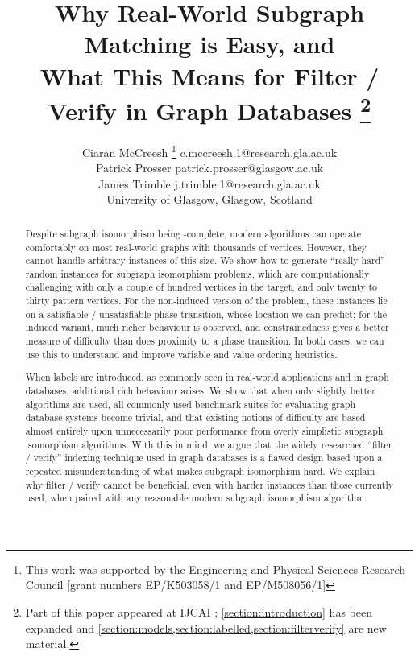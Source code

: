 \documentclass[twoside,11pt]{article}
\newcommand{\citep}[1]{\cite{#1}}
\newcommand*\samethanks[1][\value{footnote}]{\footnotemark[#1]}
\begin{document}
\title{Why Real-World Subgraph Matching is Easy, and \\ What This Means for Filter / Verify in
Graph Databases \thanks{Part of this paper appeared at IJCAI
\citep{DBLP:conf/ijcai/McCreeshPT16}; \cref{section:introduction} has been expanded and
\cref{section:models,section:labelled,section:filterverify} are new material.}}

\author{\name Ciaran McCreesh \thanks{This work was supported by the Engineering and Physical Sciences
           Research Council [grant numbers EP/K503058/1 and EP/M508056/1]} \email c.mccreesh.1@research.gla.ac.uk \\
       \name Patrick Prosser \email patrick.prosser@glasgow.ac.uk \\
       \name James Trimble \samethanks \email j.trimble.1@research.gla.ac.uk \\
   \addr University of Glasgow, Glasgow, Scotland}
\maketitle

\begin{abstract}
    Despite subgraph isomorphism being \NP-complete, modern algorithms can operate comfortably on
    most real-world graphs with thousands of vertices. However, they cannot handle arbitrary instances of
    this size. We show how to generate ``really hard'' random instances for subgraph isomorphism
    problems, which are computationally challenging with only a couple of hundred vertices in the
    target, and only twenty to thirty pattern vertices. For the non-induced version of the problem,
    these instances lie on a satisfiable / unsatisfiable phase transition, whose location we can
    predict; for the induced variant, much richer behaviour is observed, and constrainedness gives a
    better measure of difficulty than does proximity to a phase transition. In both cases, we can
    use this to understand and improve variable and value ordering heuristics.

    When labels are introduced, as commonly seen in real-world applications and in graph databases,
    additional rich behaviour arises.  We show that when only slightly better algorithms are used,
    all commonly used benchmark suites for evaluating graph database systems become trivial, and
    that existing notions of difficulty are based almost entirely upon unnecessarily poor
    performance from overly simplistic subgraph isomorphism algorithms. With this in mind, we argue
    that the widely researched ``filter / verify'' indexing technique used in graph databases is a
    flawed design based upon a repeated misunderstanding of what makes subgraph isomorphism hard. We
    explain why filter / verify cannot be beneficial, even with harder instances than those
    currently used, when paired with any reasonable modern subgraph isomorphism algorithm.
\end{abstract}
\end{document}
